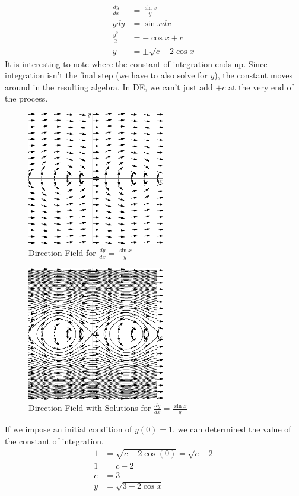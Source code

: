 \documentclass[fleqn,letterpaper]{report}
\begin{document}
\begin{example}
\begin{align*}
\frac{dy}{dx} & = \frac{\sin x}{y} \\
y dy & = \sin x dx \\
\frac{y^2}{2} & = - \cos x + c \\
y & = \pm \sqrt{c - 2\cos x}
\end{align*}
It is interesting to note where the constant of integration ends
up. Since integration isn't the final step (we have to also
solve for $y$), the constant moves around in the resulting
algebra. In DE, we can't just add $+c$ at the very end of the
process.

\begin{figure}[t]
\centering
\includegraphics[width=6cm]{figure16.eps}
\caption{Direction Field for $\frac{dy}{dx}= \frac{\sin x}{y}$}
\label{figure-direction-field6}
\end{figure}

\begin{figure}[t]
\centering
\includegraphics[width=6cm]{figure17.eps}
\caption{Direction Field with Solutions for $\frac{dy}{dx}=
\frac{\sin x}{y}$}
\label{figure-direction-field8}
\end{figure}

If we impose an initial condition of $y(0) = 1$, we can
determined the value of the constant of integration.
\begin{align*}
1 & = \sqrt{c - 2 \cos (0)} = \sqrt{c-2}\\
1 & = c-2 \\
c & = 3 \\
y & = \sqrt{3 - 2 \cos x} 
\end{align*}
\end{example}
\end{document}
